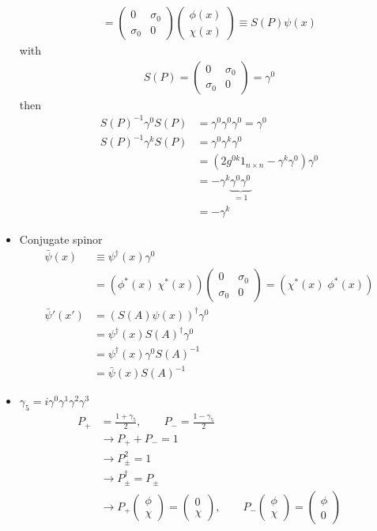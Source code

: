 \documentclass[10pt,a4paper]{report}
\theoremstyle{definition}
\begin{document}
\begin{itemize}
\begin{align}
=\left(\begin{matrix}
0 & \sigma_0\\
\sigma_0 & 0
\end{matrix}\right)
\left(\begin{matrix}
\phi(x)\\ \chi(x)
\end{matrix}\right)
\equiv S(P)\psi(x)
\end{align}
with
\begin{align}
S(P)=\left(\begin{matrix}
0 & \sigma_0\\
\sigma_0 & 0
\end{matrix}\right)
=\gamma^0
\end{align}
then
\begin{align}
S(P)^{-1}\gamma^0S(P)&=\gamma^0\gamma^0\gamma^0=\gamma^0\\
S(P)^{-1}\gamma^kS(P)&=\gamma^0\gamma^k\gamma^0\\
&=(2g^{0k}1_{n\times n}-\gamma^k\gamma^0)\gamma^0\\
&=-\gamma^k\underbrace{\gamma^0\gamma^0}_{=1}\\
&=-\gamma^k
\end{align}
\item Conjugate spinor 
\begin{align}
\bar{\psi}(x)
&\equiv\psi^\dagger(x)\gamma^0\\
&=(\phi^*(x)\; \chi^*(x))\left(\begin{matrix}
0 & \sigma_0\\
\sigma_0 & 0
\end{matrix}\right)=(\chi^*(x)\; \phi^*(x))\\
\bar{\psi}'(x')
&=(S(A)\psi(x))^\dagger\gamma^0\\
&=\psi^\dagger(x) S(A)^\dagger\gamma^0\\
&=\psi^\dagger(x) \gamma^0 S(A)^{-1}\\
&=\bar{\psi}(x) S(A)^{-1}
\end{align}
\item $\gamma_5=i\gamma^0\gamma^1\gamma^2\gamma^3$
\begin{align}
P_+&=\frac{1+\gamma_5}{2},\qquad P_-=\frac{1-\gamma_5}{2}\\
&\rightarrow P_+ + P_-=1\\
&\rightarrow P_\pm^2=1\\
&\rightarrow P_\pm^\dagger=P_\pm\\
&\rightarrow P_+\left(
\begin{matrix}
\phi\\
\chi
\end{matrix}
\right)
=\left(\begin{matrix}
0\\
\chi
\end{matrix}
\right),
\qquad
P_-\left(
\begin{matrix}
\phi\\
\chi
\end{matrix}
\right)
=\left(\begin{matrix}
\phi\\
0
\end{matrix}
\right)
\end{align}


\end{itemize}
\end{document}
